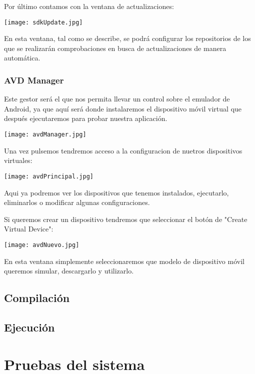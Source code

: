 Por último contamos con la ventana de actualizaciones:

\texttt{[image: sdkUpdate.jpg]}

En esta ventana, tal como se describe, se podrá configurar los repositorios de los que se realizarán comprobaciones en busca de actualizaciones de manera automática.

\subsubsection{AVD Manager}

Este gestor será el que nos permita llevar un control sobre el emulador de Android, ya que aquí será donde instalaremos el dispositivo móvil virtual que después ejecutaremos para probar nuestra aplicación.

\texttt{[image: avdManager.jpg]}

Una vez pulsemos tendremos acceso a la configuracion de nuetros dispositivos virtuales:

\texttt{[image: avdPrincipal.jpg]}

Aqui ya podremos ver los dispositivos que tenemos instalados, ejecutarlo, eliminarlos o modificar algunas configuraciones.

Si queremos crear un dispositivo tendremos que seleccionar el botón de "Create Virtual Device":

\texttt{[image: avdNuevo.jpg]}

En esta ventana simplemente seleccionaremos que modelo de dispositivo móvil queremos simular, descargarlo y utilizarlo.

\subsection{Compilación}



\subsection{Ejecución}

\section{Pruebas del sistema}
